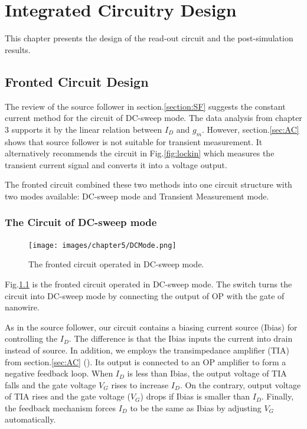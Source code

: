 \chapter{Integrated Circuitry Design}
This chapter presents the design of the read-out circuit and the post-simulation results.


\section{Fronted Circuit Design}
The review of the source follower in section.\ref{section:SF} suggests the constant current method for the circuit of DC-sweep mode.
The data analysis from chapter 3 supports it by the linear relation between $I_D$ and $g_m$.
However, section.\ref{sec:AC} shows that source follower is not suitable for transient measurement.
It alternatively recommends the circuit in Fig.\ref{fig:lockin} which measures the transient current signal and converts it into a voltage output.

The fronted circuit combined these two methods into one circuit structure with two modes available: DC-sweep mode and Transient Measurement mode.

\subsection{The Circuit of DC-sweep mode}
\begin{figure}[!htbp]
    \centering
    \texttt{[image: images/chapter5/DCMode.png]}
    \caption{The fronted circuit operated in DC-sweep mode.}
    \label{fig:DCmode}
\end{figure}
Fig.\ref{fig:DCmode} is the fronted circuit operated in DC-sweep mode.
The switch turns the circuit into DC-sweep mode by connecting the output of OP with the gate of nanowire.

As in the source follower, our circuit contains a biasing current source (Ibias) for controlling the $I_D$.
The difference is that the Ibias inputs the current into drain instead of source.
In addition, we employs the transimpedance amplifier (TIA) from section.\ref{sec:AC} (\cite{Jlockin}).
Its output is connected to an OP amplifier to form a negative feedback loop.
When $I_D$ is less than Ibias, the output voltage of TIA falls and the gate voltage $V_G$ rises to increase $I_D$.
On the contrary, output voltage of TIA rises and the gate voltage ($V_G$) drops if Ibias is smaller than $I_D$.
Finally, the feedback mechanism forces $I_D$ to be the same as Ibias by adjusting $V_G$ automatically.


